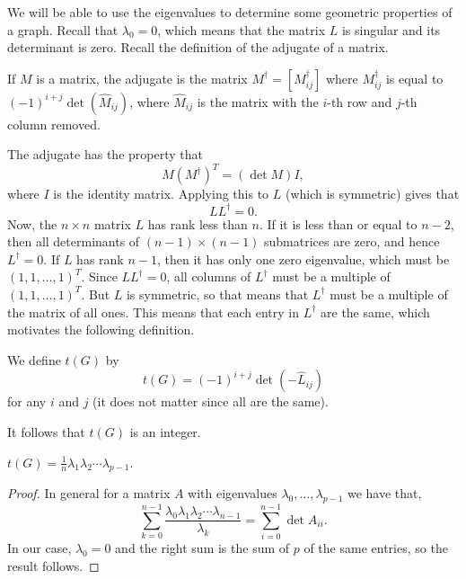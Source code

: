 We will be able to use the eigenvalues to determine some geometric properties of a graph. Recall that \(\lambda_{0}=0\), which means that the matrix \(L\) is singular and its determinant is zero.
Recall the definition of the adjugate of a matrix.

\begin{definition}
If \(M\) is a matrix, the adjugate is the matrix \(M^{\dag}=\left[M_{ij}^{\dag}\right]\) where \(M_{ij}^{\dag}\) is equal to \({\left(-1\right)}^{i+j}\det\left(\hat{M}_{ij}\right)\), where \(\hat{M}_{ij}\) is the matrix with the \(i\)-th row and \(j\)-th column removed.
\end{definition}

The adjugate has the property that
\[
M{\left(M^{\dag}\right)}^{T}=\left(\det M\right)  I,
\]
where \(I\) is the identity matrix.
Applying this to \(L\) (which is symmetric) gives that
\[
LL^{\dag}=0.
\]
Now, the \(n\times n\) matrix \(L\) has rank less than \(n\).
If it is less than or equal to \(n-2\), then all determinants of \(\left(n-1\right)\times\left(n-1\right)\) submatrices are zero, and hence \(L^{\dag}=0\).
If \(L\) has rank \(n-1\), then it has only one zero eigenvalue, which must be \({\left(1,1,\ldots,1\right)}^{T}\).
Since \(LL^{\dag}=0\), all columns of \(L^{\dag}\) must be a multiple of \({\left(1,1,\ldots,1\right)}^{T}\).
But \(L\) is symmetric, so that means that \(L^{\dag}\) must be a multiple of the matrix of all ones. This means that each entry in \(L^{\dag}\) are the same, which motivates the following definition.

\begin{definition}
We define \(t\left(G\right)\) by
\[
t\left(G\right) ={\left(-1\right)}^{i+j}\det\left(-\hat{L}_{ij}\right)
\]
for any \(i\) and \(j\) (it does not matter since all are the same).
\end{definition}

\begin{remark}
It follows that \(t\left(G\right)\) is an integer.
\end{remark}

\begin{lemma}
\(t\left(G\right)=\frac{1}{n}\lambda_{1}\lambda_{2}\cdots\lambda_{p-1}\).
\end{lemma}

\begin{proof}
In general for a matrix \(A\) with eigenvalues \(\lambda_{0},\ldots,\lambda_{p-1}\) we have that,
\[
\sum_{k=0}^{n-1}\frac{\lambda_{0}\lambda_{1}\lambda_{2}\cdots\lambda_{n-1}%
}{\lambda_{k}}=\sum_{i=0}^{n-1}\det\hat{A}_{ii}.
\]
In our case, \(\lambda_{0}=0\) and the right sum is the sum of \(p\) of the same entries, so the result follows.
\end{proof}

